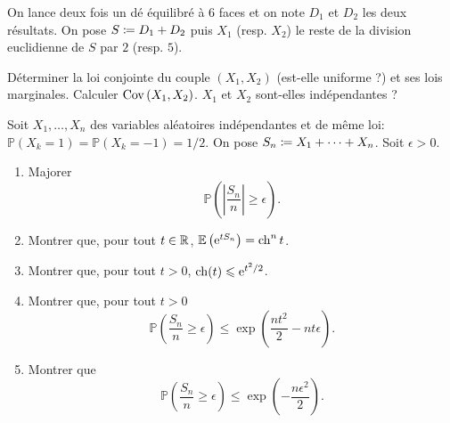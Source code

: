 \documentclass{magnolia}
\begin{document}

On lance deux fois un dé équilibré à 6 faces et on note $D_1$ et $D_2$ les deux résultats. On pose $S\coloneqq D_1+D_2$ puis $X_1$ (resp. $X_2$) le reste de la division euclidienne de $S$ par $2$ (resp. $5$). 
\begin{questions}
\question Déterminer la loi conjointe du couple $(X_1,X_2)$ (est-elle uniforme ?) et ses lois marginales.
\question  Calculer ${\rm Cov} \left( X_1,X_2 \right)$.  $X_1$ et $X_2$ sont-elles indépendantes ?
\end{questions}


Soit $X_1,\ldots,X_n$ des variables aléatoires indépendantes et de même loi: $\mathbb{P}(X_k=1)=\mathbb{P}(X_k=-1)=1/2$. On pose $S_n\coloneqq X_1+\cdots +X_n$. Soit $\epsilon>0$.
\begin{enumerate}
\item Majorer \[\mathbb{P}\left(\left|\frac{S_n}n\right|\geq \epsilon \right).\]
\item Montrer que, pour tout $t\in\mathbb{R}$, $\mathbb{E}\left({\rm e}^{tS_n}\right) = \operatorname{ch}^n t$.
\item Montrer que, pour tout $t>0$, $\operatorname{ch} (t) \leqslant {\rm e}^{t^2/2}$.
\item Montrer que, pour tout $t>0$
\[\mathbb{P}\left(\frac{S_n}n\geq \epsilon\right) \leq \exp\left( \frac{nt^2}2-nt\epsilon\right).\]
\item Montrer que
\[\mathbb{P}\left(\frac{S_n}n\geq \epsilon\right) \leq \exp\left( -\frac{n\epsilon^2}2 \right).\]
\end{enumerate}







\end{document}
